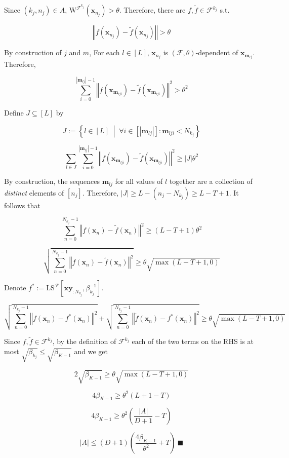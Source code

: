 \documentclass[a4paper]{article}
\newcommand{\Co}[1]{}
\newcommand{\AP}[1]{\left(#1\right)}
\newcommand{\AB}[1]{\left[#1\right]}
\newcommand{\ACM}[2]{\left\{#1\;\middle\vert\;#2\right\}}
\newcommand{\Abs}[1]{\left\vert #1 \right\vert}
\newcommand{\Norm}[1]{\left\Vert #1 \right\Vert}
\newcommand{\F}{\mathcal{F}}
\newcommand{\LS}{\mathrm{LS}}
\newcommand{\W}{\mathrm{W}}
\begin{document}
Since $(k_j,n_j)\in A$, $\W^{\F^{k_j}}\AP{\boldsymbol{x}_{n_j}}>\theta$. Therefore, there are $f,\tilde{f}\in\F^{k_j}$ s.t. 

$$\Norm{f\AP{\boldsymbol{x}_{n_j}}-\tilde{f}\AP{\boldsymbol{x}_{n_j}}}>\theta$$

By construction of $j$ and $m$, For each $l\in[L]$, $\boldsymbol{x}_{n_j}$ is $(\F,\theta)$-dependent of $\boldsymbol{x}_{\boldsymbol{m}_{lj}}$. Therefore,

$$\sum_{i=0}^{\Abs{\boldsymbol{m}_{lj}}-1}\Norm{f\AP{\boldsymbol{x}_{\boldsymbol{m}_{lji}}}-\tilde{f}\AP{\boldsymbol{x}_{\boldsymbol{m}_{lji}}}}^2>\theta^2$$

Define $J\subseteq[L]$ by

$$J:=\ACM{l\in[L]}{\forall i\in\AB{\Abs{\boldsymbol{m}_{lj}}}: \boldsymbol{m}_{lji}<N_{k_j}}$$

$$\sum_{l\in J}\sum_{i=0}^{\Abs{\boldsymbol{m}_{lj}}-1}\Norm{f\AP{\boldsymbol{x}_{\boldsymbol{m}_{lji}}}-\tilde{f}\AP{\boldsymbol{x}_{\boldsymbol{m}_{lji}}}}^2\geq\Abs{J}\theta^2$$

By construction, the sequences $\boldsymbol{m}_{lj}$ for all values of $l$ together are a collection of \textit{distinct}\Co{i} elements of $\AB{n_j}$. Therefore, $\Abs{J}\geq L-\AP{n_j-N_{k_j}}\geq L-T+1$. It follows that

$$\sum_{n=0}^{N_{k_j}-1}\Norm{f\AP{\boldsymbol{x}_n}-\tilde{f}\AP{\boldsymbol{x}_n}}^2\geq(L-T+1)\theta^2$$

$$\sqrt{\sum_{n=0}^{N_{k_j}-1}\Norm{f\AP{\boldsymbol{x}_n}-\tilde{f}\AP{\boldsymbol{x}_n}}^2}\geq\theta\sqrt{\max(L-T+1,0)}$$

Denote $f^*:=\LS^\F\AB{\boldsymbol{xy}_{:N_{k_j}},\beta_{k_j}^{-1}}$.

$$\sqrt{\sum_{n=0}^{N_{k_j}-1}\Norm{f\AP{\boldsymbol{x}_n}-f^*\AP{\boldsymbol{x}_n}}^2}+\sqrt{\sum_{n=0}^{N_{k_j}-1}\Norm{\tilde{f}\AP{\boldsymbol{x}_n}-f^*\AP{\boldsymbol{x}_n}}^2}\geq\theta\sqrt{\max(L-T+1,0)}$$

Since $f,\tilde{f}\in\F^{k_j}$, by the definition of $\F^{k_j}$ each of the two terms on the RHS is at most $\sqrt{\beta_{k_j}}\leq\sqrt{\beta_{K-1}}$ and we get

$$2\sqrt{\beta_{K-1}} \geq\theta\sqrt{\max(L-T+1,0)}$$

$$4\beta_{K-1} \geq \theta^2(L+1-T)$$

$$4\beta_{K-1} \geq\theta^2\AP{\frac{\Abs{A}}{D+1}-T}$$

$$\Abs{A}\leq(D+1)\AP{\frac{4\beta_{K-1}}{\theta^2}+T}\ \blacksquare$$
\end{document}
